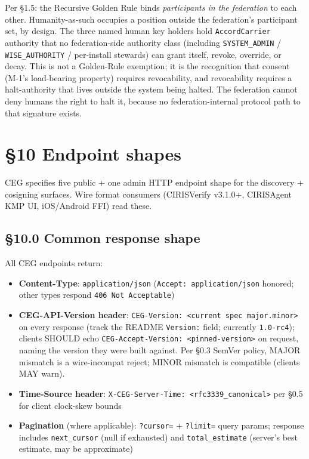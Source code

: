 \documentclass[11pt]{article}
\begin{document}
Per §1.5: the Recursive Golden Rule binds \textit{participants in the federation} to each other. Humanity-as-such occupies a position outside the federation's participant set, by design. The three named human key holders hold \texttt{AccordCarrier} authority that no federation-side authority class (including \texttt{SYSTEM\_ADMIN} / \texttt{WISE\_AUTHORITY} / per-install stewards) can grant itself, revoke, override, or decay. This is not a Golden-Rule exemption; it is the recognition that consent (M-1's load-bearing property) requires revocability, and revocability requires a halt-authority that lives outside the system being halted. The federation cannot deny humans the right to halt it, because no federation-internal protocol path to that signature exists.




\clearpage


\section*{§10 Endpoint shapes}


CEG specifies five public + one admin HTTP endpoint shape for the discovery + cosigning surfaces. Wire format consumers (CIRISVerify v3.1.0+, CIRISAgent KMP UI, iOS/Android FFI) read these.


\subsection*{§10.0 Common response shape}


All CEG endpoints return:


\begin{itemize}\setlength\itemsep{0pt}
\item \textbf{Content-Type}: \texttt{application/json} (\texttt{Accept: application/json} honored; other types respond \texttt{406 Not Acceptable})
\item \textbf{CEG-API-Version header}: \texttt{CEG-Version: <current spec major.minor>} on every response (track the README \texttt{Version:} field; currently \texttt{1.0-rc4}); clients SHOULD echo \texttt{CEG-Accept-Version: <pinned-version>} on request, naming the version they were built against. Per §0.3 SemVer policy, MAJOR mismatch is a wire-incompat reject; MINOR mismatch is compatible (clients MAY warn).
\item \textbf{Time-Source header}: \texttt{X-CEG-Server-Time: <rfc3339\_canonical>} per §0.5 for client clock-skew bounds
\item \textbf{Pagination} (where applicable): \texttt{?cursor=} + \texttt{?limit=} query params; response includes \texttt{next\_cursor} (null if exhausted) and \texttt{total\_estimate} (server's best estimate, may be approximate)
\end{itemize}
\end{document}
